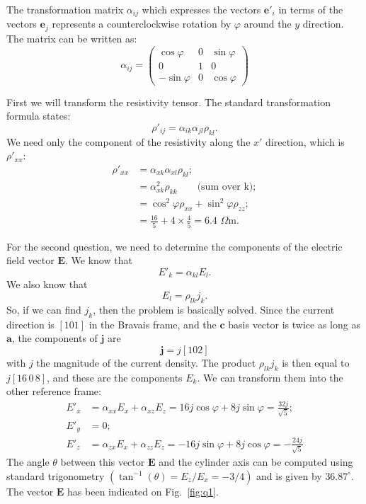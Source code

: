 \begin{example}
The transformation matrix $\alpha_{ij}$ which expresses the vectors $\mathbf{e}'_i$ in terms of the vectors 
$\mathbf{e}_j$ represents a counterclockwise rotation by $\varphi$ around the $y$ direction.  The matrix can 
be written as:
\[
	\alpha_{ij} = \left(\begin{matrix}
	\cos\varphi & 0 & \sin\varphi\\
	0 & 1 & 0 \\
	-\sin\varphi & 0 & \cos\varphi\end{matrix}\right)
\]

First we will transform the resistivity tensor.  The standard transformation formula states:
\[
	\rho'_{ij} = \alpha_{ik}\alpha_{jl}\rho_{kl}.
\]
We need only the component of the resistivity along the $x'$ direction, which is $\rho'_{xx}$:
\begin{align*}
	\rho'_{xx} &= \alpha_{xk}\alpha_{xl}\rho_{kl};\\
	&= \alpha^2_{xk}\rho_{kk}\qquad\text{(sum over k)};\\
	&= \cos^2\varphi \rho_{xx}+\sin^2\varphi \rho_{zz};\\
	&= \frac{16}{5}+4\times \frac{4}{5} = 6.4\,\,\Omega\text{m}.
\end{align*}

For the second question, we need to determine the components of the electric field vector $\mathbf{E}$.  We know
that 
\[
	E'_k = \alpha_{kl}E_{l}.
\]
We also know that 
\[
	E_l = \rho_{lk}j_k.
\]
So, if we can find $j_k$, then the problem is basically solved.  Since the current direction is $[101]$ in the 
Bravais frame, and the $\mathbf{c}$ basis vector is twice as long as $\mathbf{a}$, the components of $\mathbf{j}$
are 
\[
	\mathbf{j} = j[102]
\]
with $j$ the magnitude of the current density.  The product $\rho_{lk}j_k$ is then equal to $j[16\,0\,8]$, and these
are the components $E_k$.   We can transform them into the other reference frame:
\begin{align*}
	E'_x &={\alpha}_{xx}E_x+{\alpha}_{xz}E_z = 16j\cos\varphi + 8j\sin\varphi = \frac{32j}{\sqrt{5}};\\
	E'_y  &= 0;\\
	E'_z &={\alpha}_{zx}E_x+{\alpha}_{zz}E_z = -16j\sin\varphi+8j\cos\varphi = -\frac{24j}{\sqrt{5}}
\end{align*}
The angle $\theta$ between this vector $\mathbf{E}$ and the cylinder axis can be computed using standard trigonometry
$(\tan^{-1}(\theta)=E_z/E_x = -3/4)$ 
and is given by $36.87^{\circ}$.  The vector $\mathbf{E}$ has been indicated on Fig.~\ref{fig:q1}.
\end{example}


